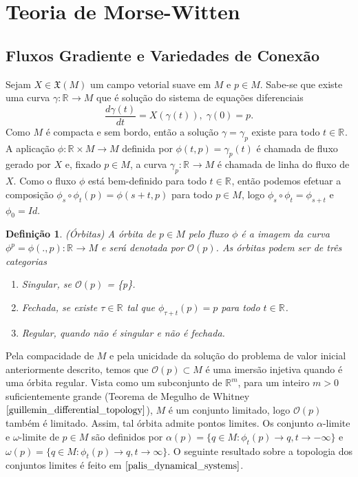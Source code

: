 \documentclass[12pt]{book}
\newtheorem{definicao}[teorema]{Definição}
\newcommand{\campossuaves}[1]{\mathfrak{X}(#1)}
\newcommand{\derivada}[2]{\frac{d #1}{d #2}}
\newcommand{\orbitaponto}[1]{\mathcal{O}(#1)}
\newcommand{\retacartesianovariedade}{\real{} \times M}
\newcommand{\real}[1]{\mathbb{R}^{#1}}
\newcommand{\reta}{\real{}}
\begin{document}
	
	\section{Teoria de Morse-Witten}
	\subsection{Fluxos Gradiente e Variedades de Conexão}\label{secao_fluxo_gradiente}
	Sejam $X \in \campossuaves{M}$ um campo vetorial suave em $M$ e $p \in M$. Sabe-se que existe uma curva $\gamma: \reta\to M$ que é solução do sistema de equações diferenciais 
	$$
	\derivada{\gamma(t)}{t} = X(\gamma(t)), \; \gamma(0) = p.
	$$
	Como $M$ é compacta e sem bordo, então a solução $\gamma = \gamma_{p}$ existe para todo $t\in \reta$. A aplicação $\phi: \retacartesianovariedade\to M$ definida por $\phi(t,p) = \gamma_{p}(t)$ é chamada de fluxo gerado por $X$ e, fixado $p\in M$, a curva $\gamma_{p}:\reta\to M$ é chamada de linha do fluxo de $X$. Como o fluxo $\phi$ está bem-definido para todo $t \in \reta$, então podemos efetuar a composição $\phi_{s}\circ\phi_{t}(p) = \phi(s+t, p)$ para todo $p\in M$, logo $\phi_{s}\circ\phi_{t} = \phi_{s+t}$ e $\phi_{0} = Id$.
	\begin{definicao}
		(Órbitas) A órbita de $p \in M$ pelo fluxo $\phi$ é a imagem da curva $\phi^{p} = \phi(.,p):\reta\to M$ e será denotada por $\orbitaponto{p}$. As órbitas podem ser de três categorias
		\begin{enumerate}
			\item Singular, se $\orbitaponto{p}$ = \{p\}.
			
			\item Fechada, se existe $\tau \in \reta$ tal que $\phi_{\tau+t}(p) = p$ para todo $t \in \reta$.
			
			\item Regular, quando não é singular e não é fechada.
		\end{enumerate}
		
	\end{definicao}
	
	Pela compacidade de $M$ e pela unicidade da solução do problema de valor inicial anteriormente descrito, temos que $\orbitaponto{p}\subset M$ é uma imersão injetiva quando é uma órbita regular. Vista como um subconjunto de $\real{m}$, para um inteiro $m>0$ suficientemente grande (Teorema de Megulho de Whitney $\cite{guillemin_differential_topology}$), $M$ é um conjunto limitado, logo $\orbitaponto{p}$ também é limitado. Assim, tal órbita admite pontos limites. Os conjunto $\alpha$-limite e $\omega$-limite de $p \in M$ são definidos por $\alpha(p) = \{q \in M: \phi_{t}(p) \to q, t \to -\infty\}$ e $\omega(p) = \{q \in M: \phi_{t}(p) \to q, t \to \infty\}$. O seguinte resultado sobre a topologia dos conjuntos limites é feito em $\cite{palis_dynamical_systems}$.
	
\end{document}
